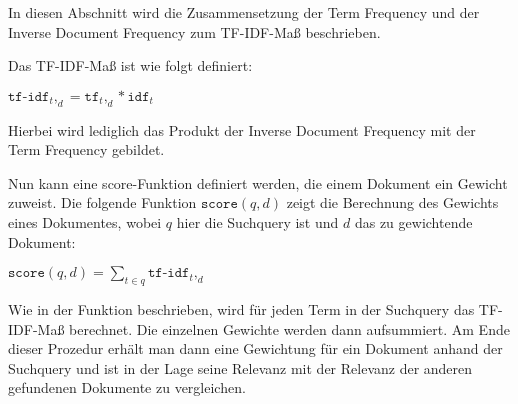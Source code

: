 In diesen Abschnitt wird die Zusammensetzung der Term Frequency und der Inverse Document Frequency zum TF-IDF-Maß beschrieben. 

\begin{defi}[TF-IDF]\cite[S. 119]{IR_Intro_Cambridge}\label{defi:TF-IDF}
	Das TF-IDF-Maß ist wie folgt definiert:
	\begin{center}
		$\displaystyle \mathtt{tf\text{-}idf}_t,_d = \mathtt{tf}_t,_d * \mathtt{idf}_t$
	\end{center}
	Hierbei wird lediglich das Produkt der Inverse Document Frequency mit der Term Frequency gebildet.
\end{defi}

Nun kann eine score-Funktion definiert werden, die einem Dokument ein Gewicht zuweist. Die folgende Funktion $\mathtt{score}(q,d)$ zeigt die Berechnung des Gewichts eines Dokumentes, wobei $q$ hier die Suchquery ist und $d$ das zu gewichtende Dokument:\cite[S. 119]{IR_Intro_Cambridge} 
\begin{center}
	$\displaystyle \mathtt{score}(q,d)=\sum\limits_{t \in q}\mathtt{tf\text{-}idf}_t,_d$
\end{center}
\newpage
Wie in der Funktion beschrieben, wird für jeden Term in der Suchquery das TF-IDF-Maß berechnet. Die einzelnen Gewichte werden dann aufsummiert. Am Ende dieser Prozedur erhält man dann eine Gewichtung für ein Dokument anhand der Suchquery und ist in der Lage seine Relevanz mit der Relevanz der anderen gefundenen Dokumente zu vergleichen.
